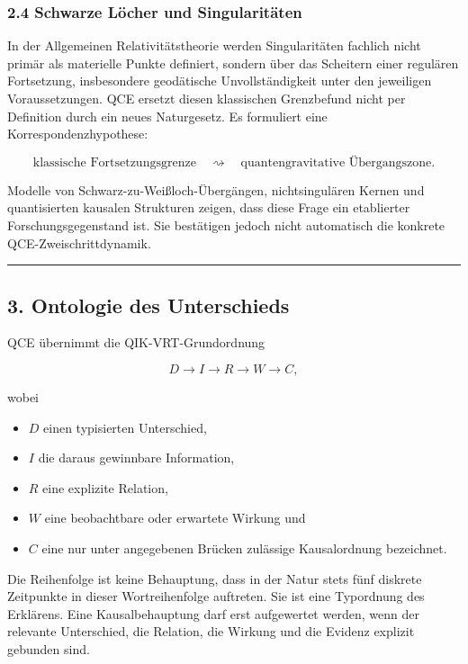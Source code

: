 \documentclass[
  11pt,
  a4paper,
]{article}
\providecommand{\tightlist}{%
  \setlength{\itemsep}{0pt}\setlength{\parskip}{0pt}}
\begin{document}
\subsubsection{2.4 Schwarze Löcher und
Singularitäten}\label{schwarze-luxf6cher-und-singularituxe4ten}

In der Allgemeinen Relativitätstheorie werden Singularitäten fachlich
nicht primär als materielle Punkte definiert, sondern über das Scheitern
einer regulären Fortsetzung, insbesondere geodätische Unvollständigkeit
unter den jeweiligen Voraussetzungen. QCE ersetzt diesen klassischen
Grenzbefund nicht per Definition durch ein neues Naturgesetz. Es
formuliert eine Korrespondenzhypothese:

\[
\text{klassische Fortsetzungsgrenze}
\quad\rightsquigarrow\quad
\text{quantengravitative Übergangszone}.
\]

Modelle von Schwarz-zu-Weißloch-Übergängen, nichtsingulären Kernen und
quantisierten kausalen Strukturen zeigen, dass diese Frage ein
etablierter Forschungsgegenstand ist. Sie bestätigen jedoch nicht
automatisch die konkrete QCE-Zweischrittdynamik.

\begin{center}\rule{0.5\linewidth}{0.5pt}\end{center}

\subsection{3. Ontologie des
Unterschieds}\label{ontologie-des-unterschieds}

QCE übernimmt die QIK-VRT-Grundordnung

\[
D \rightarrow I \rightarrow R \rightarrow W \rightarrow C,
\]

wobei

\begin{itemize}
\tightlist
\item
  \(D\) einen typisierten Unterschied,
\item
  \(I\) die daraus gewinnbare Information,
\item
  \(R\) eine explizite Relation,
\item
  \(W\) eine beobachtbare oder erwartete Wirkung und
\item
  \(C\) eine nur unter angegebenen Brücken zulässige Kausalordnung
  bezeichnet.
\end{itemize}

Die Reihenfolge ist keine Behauptung, dass in der Natur stets fünf
diskrete Zeitpunkte in dieser Wortreihenfolge auftreten. Sie ist eine
Typordnung des Erklärens. Eine Kausalbehauptung darf erst aufgewertet
werden, wenn der relevante Unterschied, die Relation, die Wirkung und
die Evidenz explizit gebunden sind.
\end{document}

